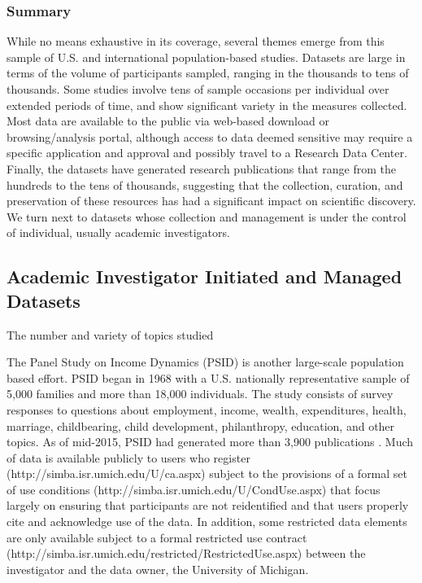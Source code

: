 \documentclass[letterpaper,man,apacite]{apa6}
\begin{document}
\subsubsection{Summary}

While no means exhaustive in its coverage, several themes emerge from this sample of U.S. and international population-based studies.
Datasets are large in terms of the volume of participants sampled, ranging in the thousands to tens of thousands.
Some studies involve tens of sample occasions per individual over extended periods of time, and show significant variety in the measures collected.
Most data are available to the public via web-based download or browsing/analysis portal, although access to data deemed sensitive may require a specific application and approval and possibly travel to a Research Data Center.
Finally, the datasets have generated research publications that range from the hundreds to the tens of thousands, suggesting that the collection, curation, and preservation of these resources has had a significant impact on scientific discovery.
We turn next to datasets whose collection and management is under the control of individual, usually academic investigators.

\subsection{Academic Investigator Initiated and Managed Datasets}

The number and variety of topics studied 

The Panel Study on Income Dynamics (PSID) \cite{PSID} is another large-scale population based effort.
PSID began in 1968 with a U.S. nationally representative sample of 5,000 families and more than 18,000 individuals.
The study consists of survey responses to questions about employment, income, wealth, expenditures, health, marriage, childbearing, child development, philanthropy, education, and other topics. As of mid-2015, PSID had generated more than 3,900 publications \cite{PSID_pubs}. 
Much of data is available publicly to users who register (http://simba.isr.umich.edu/U/ca.aspx) subject to the provisions of a formal set of use conditions (http://simba.isr.umich.edu/U/CondUse.aspx) that focus largely on ensuring that participants are not reidentified and that users properly cite and acknowledge use of the data. 
In addition, some restricted data elements are only available subject to a formal restricted use contract (http://simba.isr.umich.edu/restricted/RestrictedUse.aspx) between the investigator and the data owner, the University of Michigan.
\end{document}
